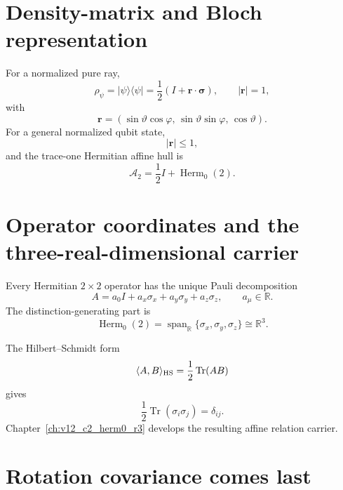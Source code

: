 \section{Density-matrix and Bloch representation}

For a normalized pure ray,
\begin{equation}
\rho_\psi=|\psi\rangle\langle\psi|
=
\frac12
\left(
I+\mathbf r\cdot\boldsymbol\sigma
\right),
\qquad
|\mathbf r|=1,
\end{equation}
with
\begin{equation}
\mathbf r
=
(
\sin\vartheta\cos\varphi,\,
\sin\vartheta\sin\varphi,\,
\cos\vartheta
).
\end{equation}
For a general normalized qubit state,
\begin{equation}
|\mathbf r|\le1,
\end{equation}
and the trace-one Hermitian affine hull is
\begin{equation}
\boxed{
\mathcal A_2
=
\frac12I+\operatorname{Herm}_0(2).
}
\label{eq:v12_affine_qubit_hull}
\end{equation}

\section{Operator coordinates and the three-real-dimensional carrier}

Every Hermitian $2\times2$ operator has the unique Pauli decomposition
\begin{equation}
A
=
a_0I
+
a_x\sigma_x
+
a_y\sigma_y
+
a_z\sigma_z,
\qquad
a_\mu\in\mathbb R.
\end{equation}
The distinction-generating part is
\begin{equation}
\boxed{
\operatorname{Herm}_0(2)
=
\operatorname{span}_{\mathbb R}
\{\sigma_x,\sigma_y,\sigma_z\}
\cong
\mathbb R^3.
}
\label{eq:v12_herm0_preview}
\end{equation}

The Hilbert--Schmidt form
\begin{equation}
\langle A,B\rangle_{\rm HS}
=
\frac12\operatorname{Tr}(AB)
\end{equation}
gives
\begin{equation}
\frac12\operatorname{Tr}(\sigma_i\sigma_j)
=
\delta_{ij}.
\end{equation}
Chapter~\ref{ch:v12_c2_herm0_r3} develops the resulting affine relation carrier.

\section{Rotation covariance comes last}

